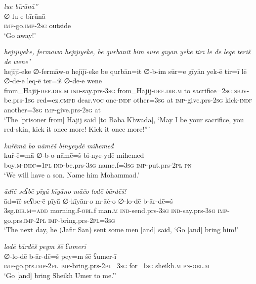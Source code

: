 \ea \label{BP.166}
\textit{lue bīrūnā”} \\ 
\gll ∅-lu-e bīrūnā \\ 
 \textsc{imp-}go.\textsc{imp-}\textsc{2sg} outside \\ 
\glt `Go away!'
\z 
 
\ea \label{BP.172}
\textit{hejījīyeke, fermāwo hejījīyeke, be qurbānit bim sūre gīyān yekē tirī lē de leqē teriš de wene’} \\ 
\gll hejījī-eke ∅-fermāw-o hejījī-eke be qurbān=it ∅-b-im sūr=e gīyān yek-ē tir=ī lē ∅-de-e leq-ē ter=iš ∅-de-e wene \\ 
 from\_Hajij\textsc{-def}\textsc{.dir}\textsc{.m} \textsc{ind-}say.prs\textsc{-3sg} from\_Hajij\textsc{-def}\textsc{.dir}\textsc{.m} to sacrifice\textsc{=\textsc{2sg}} \textsc{sbjv-}be.prs\textsc{-\textsc{1sg}} red=ez\textsc{.cmpd} dear.\textsc{voc} one\textsc{-indf} other\textsc{=3sg} at \textsc{imp-}give.prs-\textsc{2sg} kick\textsc{-indf} another\textsc{=3sg} \textsc{imp-}give.prs-\textsc{2sg} at \\ 
\glt `The [prisoner from] Hajij said [to Baba Khwada], ‘May I be your sacrifice, you red-skin, kick it once more! Kick it once more!”'
\z 
 
\ea \label{BP.186}
\textit{kuřēmā bo nāmēš binyeydē miħemeđ} \\ 
\gll kuř-ē=mā ∅-b-o nāmē=š bi-nye-ydē miħemeđ \\ 
 boy\textsc{.m}\textsc{-indf}\textsc{=\textsc{1pl}} \textsc{ind-}be.prs\textsc{-3sg} name.f\textsc{=3sg} \textsc{imp-}put.prs-\textsc{2pl} \textsc{pn} \\ 
\glt `We will have a son. Name him Mohammad.'
\z 
 
\ea \label{ŠJ.20}
\textit{āđīč seʕbē pīyā kīyāno māčo lodē bārdēš!} \\ 
\gll āđ=īč seʕbe-ē pīyā ∅-kīyān-o m-āč-o ∅-lo-dē b-ār-dē=š \\ 
 3sg\textsc{.dir}\textsc{.m}\textsc{=add} morning.f\textsc{-obl}.f man\textsc{.m} \textsc{ind-}send.prs\textsc{-3sg} \textsc{ind-}say.prs\textsc{-3sg} \textsc{imp-}go.prs.\textsc{imp-}\textsc{2pl} \textsc{imp-}bring.prs-\textsc{2pl}\textsc{=3sg} \\ 
\glt `The next day, he (Jafir Sān) sent some men [and] said, ‘Go [and] bring him!'
\z 
 
\ea \label{ŠJ.21}
\textit{lodē bārdēš peym šē ʕumerī} \\ 
\gll ∅-lo-dē b-ār-dē=š pey=m šē ʕumer-ī \\ 
 \textsc{imp-}go.prs.\textsc{imp-}\textsc{2pl} \textsc{imp-}bring.prs-\textsc{2pl}\textsc{=3sg} for\textsc{=\textsc{1sg}} sheikh\textsc{.m} \textsc{pn}\textsc{-obl}\textsc{.m} \\ 
\glt `Go [and] bring Sheikh Umer to me.’'
\z 
 
